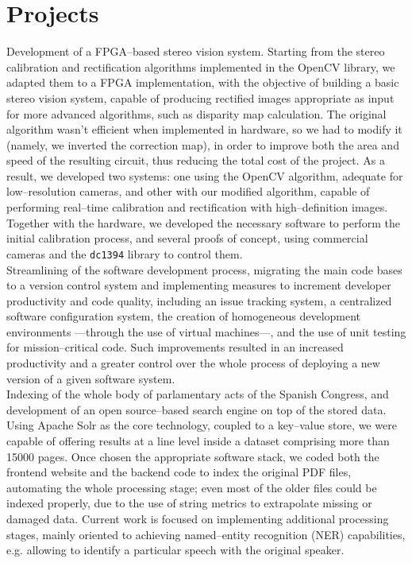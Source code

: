 \documentclass[11pt, a4paper]{article}
\newcommand{\years}[1]{\marginnote{\scriptsize #1}}
\begin{document}
\section*{Projects} %
\noindent
\years{2011\\\textsc{TEDESYS}}Development of a FPGA--based stereo vision system. Starting from the stereo calibration and rectification algorithms implemented in the OpenCV library, we adapted them to a FPGA implementation, with the objective of building a basic stereo vision system, capable of producing rectified images appropriate as input for more advanced algorithms, such as disparity map calculation. The original algorithm wasn't efficient when implemented in hardware, so we had to modify it (namely, we inverted the correction map), in order to improve both the area and speed of the resulting circuit, thus reducing the total cost of the project. As a result, we developed two systems: one using the OpenCV algorithm, adequate for low--resolution cameras, and other with our modified algorithm, capable of performing real--time calibration and rectification with high--definition images. Together with the hardware, we developed the necessary software to perform the initial calibration process, and several proofs of concept, using commercial cameras and the \texttt{dc1394} library to control them.\\
\years{2011\\\textsc{ITEISA}}Streamlining of the software development process, migrating the main code bases to a version control system and implementing measures to increment developer productivity and code quality, including an issue tracking system, a centralized software configuration system, the creation of homogeneous development environments ---through the use of virtual machines---, and the use of unit testing for mission--critical code. Such improvements resulted in an increased productivity and a greater control over the whole process of deploying a new version of a given software system.\\
\years{2011--present\\\textsc{ITEISA}}Indexing of the whole body of parlamentary acts of the Spanish Congress, and development of an open source--based search engine on top of the stored data. Using Apache Solr as the core technology, coupled to a key--value store, we were capable of offering results at a line level inside a dataset comprising more than 15000 pages. Once chosen the appropriate software stack, we coded both the frontend website and the backend code to index the original PDF files, automating the whole processing stage; even most of the older files could be indexed properly, due to the use of string metrics to extrapolate missing or damaged data. Current work is focused on implementing additional processing stages, mainly oriented to achieving named--entity recognition (NER) capabilities, e.g. allowing to identify a particular speech with the original speaker.
\end{document}
